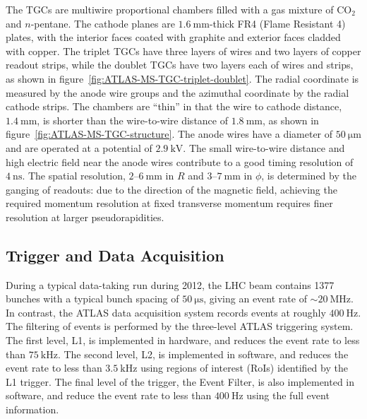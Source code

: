 The TGCs are multiwire proportional chambers filled with a gas mixture of CO$_2$ and $n$-pentane. The cathode planes are $\SI{1.6}{\milli\meter}$-thick FR4 (Flame Resistant 4) plates, with the interior faces coated with graphite and exterior faces cladded with copper. The triplet TGCs have three layers of wires and two layers of copper readout strips, while the doublet TGCs have two layers each of wires and strips, as shown in figure~\ref{fig:ATLAS-MS-TGC-triplet-doublet}. The radial coordinate is measured by the anode wire groups and the azimuthal coordinate by the radial cathode strips. The chambers are ``thin'' in that the wire to cathode distance, $\SI{1.4}{\milli\meter}$, is shorter than the wire-to-wire distance of $\SI{1.8}{\milli\meter}$, as shown in figure~\ref{fig:ATLAS-MS-TGC-structure}. The anode wires have a diameter of $\SI{50}{\micro\meter}$ and are operated at a potential of $\SI{2.9}{\kilo\volt}$. The small wire-to-wire distance and high electric field near the anode wires contribute to a good timing resolution of $\SI{4}{\nano\second}$. The spatial resolution, $2$--$\SI{6}{\milli\meter}$ in $R$ and $3$--$\SI{7}{\milli\meter}$ in $\phi$, is determined by the ganging of readouts: due to the direction of the magnetic field, achieving the required momentum resolution at fixed transverse momentum requires finer resolution at larger pseudorapidities. 


\subsection{Trigger and Data Acquisition}
During a typical data-taking run during 2012, the LHC beam contains 1377 bunches with a typical bunch spacing of $\SI{50}{\micro\second}$, giving an event rate of $\sim \SI{20}{\mega\hertz}$. In contrast, the ATLAS data acquisition system records events at roughly $\SI{400}{\hertz}$. The filtering of events is performed by the three-level ATLAS triggering system. The first level, L1, is implemented in hardware, and reduces the event rate to less than $\SI{75}{\kilo\hertz}$. The second level, L2, is implemented in software, and reduces the event rate to less than $\SI{3.5}{\kilo\hertz}$ using regions of interest (RoIs) identified by the L1 trigger. The final level of the trigger, the Event Filter, is also implemented in software, and reduce the event rate to less than $\SI{400}{\hertz}$ using the full event information. 

